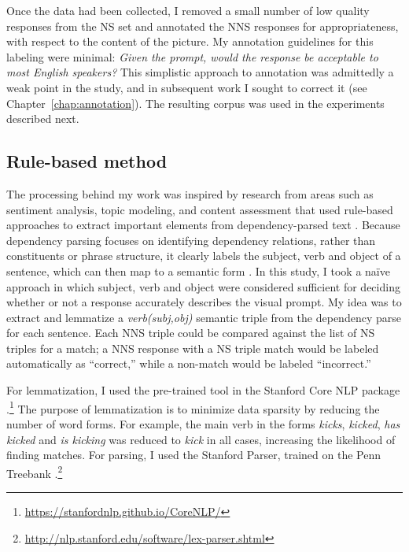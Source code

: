 Once the data had been collected, I removed a small number of low quality responses from the NS set and annotated the NNS responses for appropriateness, with respect to the content of the picture. My annotation guidelines for this labeling were minimal: \textit{Given the prompt, would the response be acceptable to most English speakers?} This simplistic approach to annotation was admittedly a weak point in the study, and in subsequent work I sought to correct it (see Chapter~\ref{chap:annotation}). The resulting corpus was used in the experiments described next.


\subsection{Rule-based method}
\label{sec:rule-method}

The processing behind my work was inspired by research from areas such as sentiment analysis, topic modeling, and content assessment that used rule-based approaches to extract important elements from dependency-parsed text \citep{nastase2006,bailey:meurers:08,dicaro2013}. Because dependency parsing focuses on identifying dependency relations, rather than constituents or phrase structure, it clearly labels the subject, verb and object of a sentence, which can then map to a semantic form \citep{Kuebler.McDonald.Nivre-09}. In this study, I took a na\"ive approach in which subject, verb and object were considered sufficient for deciding whether or not a response accurately describes the visual prompt. My idea was to extract and lemmatize a \textit{verb(subj,obj)} semantic triple from the dependency parse for each sentence. Each NNS triple could be compared against the list of NS triples for a match; a NNS response with a NS triple match would be labeled automatically as ``correct,'' while a non-match would be labeled ``incorrect.''

For lemmatization, I used the pre-trained tool in the Stanford Core NLP package \citep{stanford-corenlp-2014}.\footnote{\url{https://stanfordnlp.github.io/CoreNLP/}} The purpose of lemmatization is to minimize data sparsity by reducing the number of word forms. For example, the main verb in the forms \textit{kicks}, \textit{kicked}, \textit{has kicked} and \textit{is kicking} was reduced to \textit{kick} in all cases, increasing the likelihood of finding matches. For parsing, I used the Stanford Parser, trained on the Penn Treebank \citep{demarneffe:ea:06, klein:manning:03}.\footnote{\url{http://nlp.stanford.edu/software/lex-parser.shtml}}


